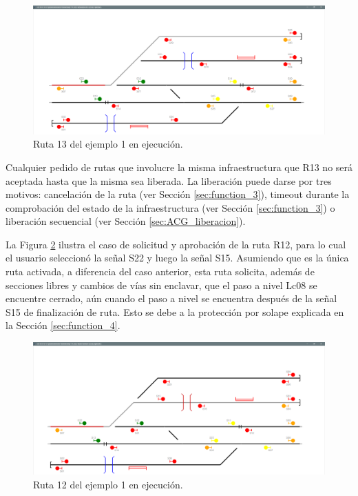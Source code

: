 	\begin{figure}[H]
		\centering
		\includegraphics[origin = c, width=1\textwidth]{resultados-obtenidos/ejemplo1/images/AGG_R13}
		\centering\caption{Ruta 13 del ejemplo 1 en ejecución.}
		\label{fig:EJ1_AGG_R13}
	\end{figure}
	
	Cualquier pedido de rutas que involucre la misma infraestructura que R13 no será aceptada hasta que la misma sea liberada. La liberación puede darse por tres motivos: cancelación de la ruta (ver Sección \ref{sec:function_3}), timeout durante la comprobación del estado de la infraestructura (ver Sección \ref{sec:function_3}) o liberación secuencial (ver Sección \ref{sec:ACG_liberacion}).	
	
	La Figura \ref{fig:EJ1_AGG_R12}	ilustra el caso de solicitud y aprobación de la ruta R12, para lo cual el usuario seleccionó la señal S22 y luego la señal S15. Asumiendo que es la única ruta activada, a diferencia del caso anterior, esta ruta solicita, además de secciones libres y cambios de vías sin enclavar, que el paso a nivel Lc08 se encuentre cerrado, aún cuando el paso a nivel se encuentra después de la señal S15 de finalización de ruta. Esto se debe a la protección por solape explicada en la Sección \ref{sec:function_4}.

	\begin{figure}[H]
		\centering
		\includegraphics[origin = c, width=1\textwidth]{resultados-obtenidos/ejemplo1/images/AGG_R12}
		\centering\caption{Ruta 12 del ejemplo 1 en ejecución.}
		\label{fig:EJ1_AGG_R12}
	\end{figure}
	
